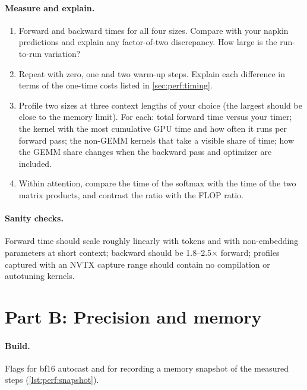 \paragraph{Measure and explain.}
\begin{enumerate}
\item Forward and backward times for all four sizes. Compare with your napkin predictions and
  explain any factor-of-two discrepancy. How large is the run-to-run variation?
\item Repeat with zero, one and two warm-up steps. Explain each difference in terms of the one-time
  costs listed in \cref{sec:perf:timing}.
\item Profile two sizes at three context lengths of your choice (the largest should be close to the
  memory limit). For each: total forward time versus your timer; the kernel with the most cumulative
  GPU time and how often it runs per forward pass; the non-GEMM kernels that take a visible share
  of time; how the GEMM share changes when the backward pass and optimizer are included.
\item Within attention, compare the time of the softmax with the time of the two matrix products,
  and contrast the ratio with the FLOP ratio.
\end{enumerate}

\paragraph{Sanity checks.} Forward time should scale roughly linearly with tokens and with
non-embedding parameters at short context; backward should be 1.8--2.5$\times$ forward; profiles
captured with an NVTX capture range should contain no compilation or autotuning kernels.

\section{Part B: Precision and memory}\label{sec:proj2:b}

\paragraph{Build.} Flags for bf16 autocast and for recording a memory snapshot of the measured
steps (\cref{lst:perf:snapshot}).

